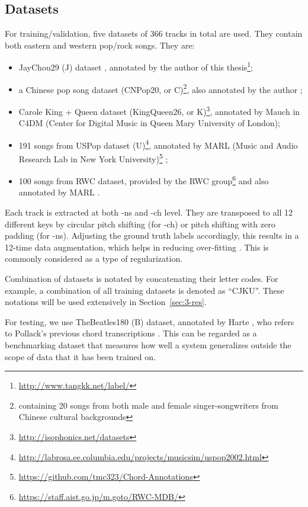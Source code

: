 \subsection{Datasets}
For training/validation, five datasets of 366 tracks in total are used. They contain both eastern and western pop/rock songs. They are:
\begin{itemize}
\item JayChou29 (J) dataset \cite{deng2016chord}, annotated by the author of this thesis\footnote{\url{http://www.tangkk.net/label/}};
\item a Chinese pop song dataset (CNPop20, or C)\footnote{containing 20 songs from both male and female singer-songwriters from Chinese cultural backgrounds}, also annotated by the author \cite{deng2016hybrid};
\item Carole King + Queen dataset (KingQueen26, or K)\footnote{\url{http://isophonics.net/datasets}}, annotated by Mauch \cite{mauch2009omras2} in C4DM (Center for Digital Music in Queen Mary University of London);
\item 191 songs from USPop dataset (U)\footnote{\url{http://labrosa.ee.columbia.edu/projects/musicsim/uspop2002.html}}, annotated by MARL (Music and Audio Research Lab in New York University)\footnote{\url{https://github.com/tmc323/Chord-Annotations}} \cite{cho2014improved};
\item 100 songs from RWC dataset, provided by the RWC group\footnote{\url{https://staff.aist.go.jp/m.goto/RWC-MDB/}} and also annotated by MARL \cite{cho2014improved}.
\end{itemize}


Each track is extracted at both -ns and -ch level. They are transposed to all 12 different keys by circular pitch shifting (for -ch) or pitch shifting with zero padding (for -ns). Adjusting the ground truth labels accordingly, this results in a 12-time data augmentation, which helps in reducing over-fitting \cite{cho2014improved,humphrey2015exploration}. This is commonly considered as a type of regularization.

Combination of datasets is notated by concatenating their letter codes. For example, a combination of all training datasets is denoted as ``CJKU''. These notations will be used extensively in Section~\ref{sec:3-res}.

For testing, we use TheBeatles180 (B) dataset, annotated by Harte \cite{harte2010towards}, who refers to Pollack's previous chord transcriptions \cite{pollack2000notes}. This can be regarded as a benchmarking dataset that measures how well a system generalizes outside the scope of data that it has been trained on.

